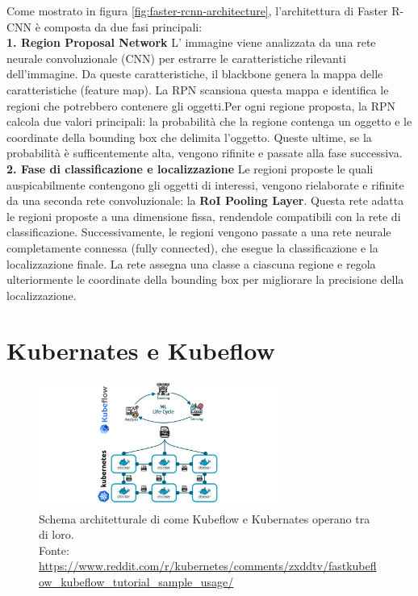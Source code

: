 Come mostrato in figura \ref{fig:faster-rcnn-architecture}, l'architettura di Faster R-CNN 
è composta da due fasi principali:\\

\textbf{1. Region Proposal Network}
L' immagine viene analizzata da una rete neurale convoluzionale (CNN) per estrarre
le caratteristiche rilevanti dell'immagine. Da queste caratteristiche, il blackbone
genera la mappa delle caratteristiche (feature map). La RPN scansiona questa mappa 
e identifica le regioni che potrebbero contenere gli oggetti.Per ogni regione proposta,
la RPN calcola due valori principali: la probabilità che la regione contenga un oggetto
e le coordinate della bounding box che delimita l'oggetto. Queste ultime, se la probabilità
è sufficentemente alta, vengono rifinite e passate alla fase successiva.\\

\textbf{2. Fase di classificazione e localizzazione}
Le regioni proposte le quali auspicabilmente contengono gli oggetti di interessi,
vengono rielaborate e rifinite da una seconda rete convoluzionale: la \textbf{RoI Pooling Layer}.
Questa rete adatta le regioni proposte a una dimensione fissa, rendendole compatibili
con la rete di classificazione. Successivamente, le regioni vengono passate a una rete
neurale completamente connessa (fully connected), che esegue la classificazione e la
localizzazione finale. La rete assegna una classe a ciascuna regione e regola ulteriormente
le coordinate della bounding box per migliorare la precisione della localizzazione.




\section{Kubernates e Kubeflow}
\begin{figure}[H]
    \centering
    \includegraphics[width=0.7\textwidth]{images/kubernates-kubeflow-schema.png}
        \caption{Schema architetturale di come Kubeflow e Kubernates operano tra di loro.\\
        Fonte: \url{https://www.reddit.com/r/kubernetes/comments/zxddtv/fastkubeflow_kubeflow_tutorial_sample_usage/}}
    \label{fig:kubeflow-architecture}
\end{figure}


